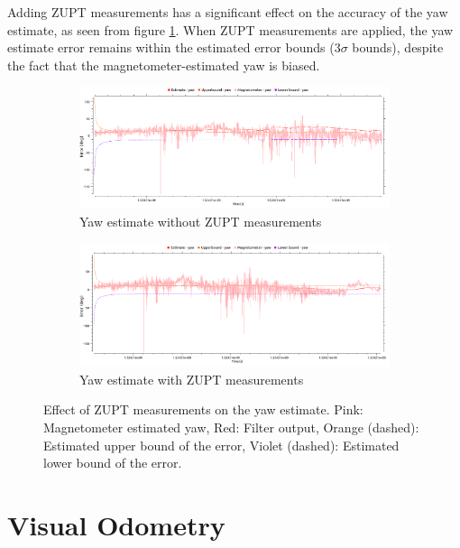 Adding \gls{ZUPT} measurements has a significant effect on the accuracy of the yaw estimate, as seen from figure \ref{fig:pa:zuptYaw}. When \gls{ZUPT} measurements are applied, the yaw estimate error remains within the estimated error bounds (3$\sigma$ bounds), despite the fact that the magnetometer-estimated yaw is biased.
\begin{figure}[h]
	\centering
    \begin{subfigure}{\textwidth}
        \includegraphics[width=\textwidth]{figs/yaw-without-zupt.png}
        \caption{Yaw estimate without \gls{ZUPT} measurements}
    \end{subfigure}
    \begin{subfigure}{\textwidth}
        \includegraphics[width=\textwidth]{figs/yaw-with-zupt.png}
        \caption{Yaw estimate with \gls{ZUPT} measurements}
    \end{subfigure}
    \caption[Effect of \gls{ZUPT} measurements on the yaw estimate]{Effect of \gls{ZUPT} measurements on the yaw estimate. Pink: Magnetometer estimated yaw, Red: Filter output, Orange (dashed): Estimated upper bound of the error, Violet (dashed): Estimated lower bound of the error.}
    \label{fig:pa:zuptYaw}
\end{figure}









\section{Visual Odometry}
\label{sec:VisualOdometry}


